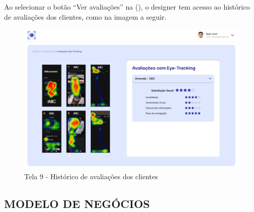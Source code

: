 Ao selecionar o botão “Ver avaliações” na (), o designer tem acesso ao histórico de avaliações dos clientes, como na imagem a seguir.

\begin{figure}[H]
    \centering
    \caption{Tela 9 - Histórico de avaliações dos clientes}%
    \label{fig:pg-tela9}
    \includegraphics[width=0.72\linewidth]{Illustrations/tela9.png}
\end{figure}

\subsection*{MODELO DE NEGÓCIOS}

